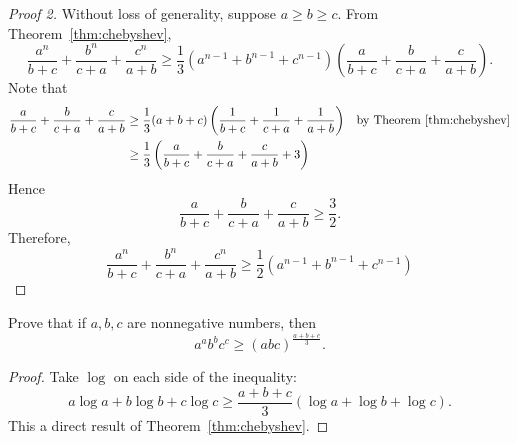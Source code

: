 \documentclass[../main.tex]{subfiles}
\begin{document}
\begin{proof}[Proof 2]
    Without loss of generality, suppose $a \geq b \geq c$.
    From Theorem~\ref{thm:chebyshev},
    \[
        \frac{a^n}{b + c} + \frac{b^n}{c + a} + \frac{c^n}{a + b} \geq \frac 1 3 \left( a^{n-1} + b^{n-1} + c^{n-1}\right) \left(\frac{a}{b + c} + \frac{b}{c + a} + \frac{c}{a + b}\right).
    \]
    Note that
    \begin{align*}
        \frac{a}{b + c} + \frac{b}{c + a} + \frac{c}{a + b} &\geq \frac 1 3 (a + b + c) \left(\frac{1}{b + c} + \frac{1}{c + a} + \frac{1}{a + b}\right) &\text{by Theorem~\ref{thm:chebyshev}}\\
                                                            &\geq \frac 1 3 \left( \frac{a}{b + c} + \frac{b}{c + a} + \frac{c}{a + b} + 3\right)
    \end{align*}
    Hence 
    \[
        \frac{a}{b + c} + \frac{b}{c + a} + \frac{c}{a + b} \geq \frac 3 2.
    \]
    Therefore,
    \[
        \frac{a^n}{b + c} + \frac{b^n}{c + a} + \frac{c^n}{a + b} \geq \frac 1 2 \left( a^{n-1} + b^{n-1} + c^{n-1}\right)
    \]
\end{proof}

\begin{exercise}
    Prove that if $a, b, c$ are nonnegative numbers, then
    \[
        a^a b^b c^c \geq (abc)^\frac{a + b + c}{3}.
    \]
\end{exercise}
\begin{proof}
    Take $\log$ on each side of the inequality:
    \[
        a \log a + b \log b + c \log c \geq \frac{a + b + c}{3} ( \log a + \log b + \log c).
    \]
    This a direct result of Theorem~\ref{thm:chebyshev}.
\end{proof}
\end{document}
